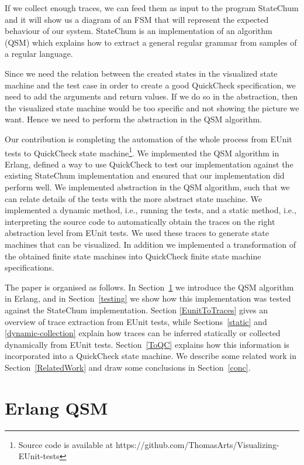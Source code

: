 \documentclass[]{sigplanconf}
\begin{document}
If we collect enough traces, we can feed them as input to the
program \mbox{StateChum\cite{statechum}} and it will show us a diagram
of an FSM that will represent the expected behaviour of our system.
StateChum is an implementation of an algorithm (QSM)
which explains how to extract a general regular grammar from samples
of a regular language.

Since we need the relation between the created states in the visualized state machine and the test case in order to create a good QuickCheck specification, we need to add the arguments and return values. If we do so in the abstraction, then the visualized state machine would be too specific and not showing the picture we want. Hence we need to perform the abstraction in the QSM algorithm.

Our contribution is completing the automation of the whole process from EUnit tests to QuickCheck state machine\footnote{Source code is available at  https://github.com/ThomasArts/Visualizing-EUnit-tests}. We implemented the QSM algorithm in Erlang, defined a way to use QuickCheck to test our implementation against the existing StateChum implementation and ensured that our implementation did perform well. We implemented abstraction in the QSM algorithm, such that we can relate details of the tests with the more abstract state machine. We implemented a dynamic method, i.e., running the tests, and a static method, i.e., interpreting the source code to automatically obtain the traces on the right abstraction level from EUnit tests. We used these traces to generate state machines that can be visualized. In addition we implemented
a transformation of the obtained finite state machines into QuickCheck finite state machine specifications.

The paper is organised as follows. In Section~\ref{QSM} we introduce the QSM algorithm in Erlang, and in Section~\ref{testing} we show how this implementation was tested against the StateChum implementation. Section \ref{EunitToTraces} gives an overview of trace extraction from EUnit tests, while Sections~\ref{static} and \ref{dynamic-collection} explain how traces can be inferred statically or collected dynamically from EUnit tests. Section~\ref{ToQC} explains how this information is incorporated into a QuickCheck state machine. We describe some related work in Section~\ref{RelatedWork} and draw some conclusions in Section~\ref{conc}.

\section{Erlang QSM}
\label{QSM}
\end{document}
